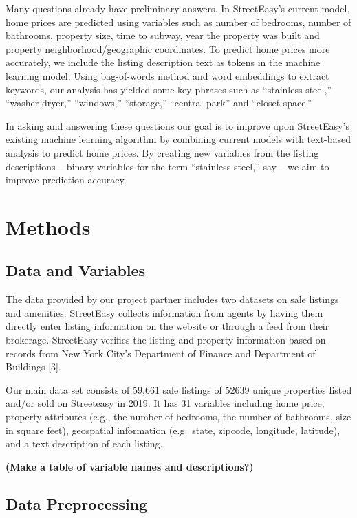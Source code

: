 \documentclass[10pt,letterpaper]{article}
\begin{document}
Many questions already have preliminary answers. In StreetEasy's current
model, home prices are predicted using variables such as number of
bedrooms, number of bathrooms, property size, time to subway, year the
property was built and property neighborhood/geographic coordinates. To
predict home prices more accurately, we include the listing description
text as tokens in the machine learning model. Using bag-of-words method
and word embeddings to extract keywords, our analysis has yielded some
key phrases such as ``stainless steel,'' ``washer dryer,'' ``windows,''
``storage,'' ``central park'' and ``closet space.''

In asking and answering these questions our goal is to improve upon
StreetEasy's existing machine learning algorithm by combining current
models with text-based analysis to predict home prices. By creating new
variables from the listing descriptions -- binary variables for the term
``stainless steel,'' say -- we aim to improve prediction accuracy.

\hypertarget{methods}{%
\section{Methods}\label{methods}}

\hypertarget{data-and-variables}{%
\subsection{Data and Variables}\label{data-and-variables}}

The data provided by our project partner includes two datasets on sale
listings and amenities. StreetEasy collects information from agents by
having them directly enter listing information on the website or through
a feed from their brokerage. StreetEasy verifies the listing and
property information based on records from New York City's Department of
Finance and Department of Buildings {[}3{]}.

Our main data set consists of 59,661 sale listings of 52639 unique
properties listed and/or sold on Streeteasy in 2019. It has 31 variables
including home price, property attributes (e.g., the number of bedrooms,
the number of bathrooms, size in square feet), geospatial information
(e.g.~state, zipcode, longitude, latitude), and a text description of
each listing.

\textbf{(Make a table of variable names and descriptions?)}

\hypertarget{data-preprocessing}{%
\subsection{Data Preprocessing}\label{data-preprocessing}}
\end{document}
